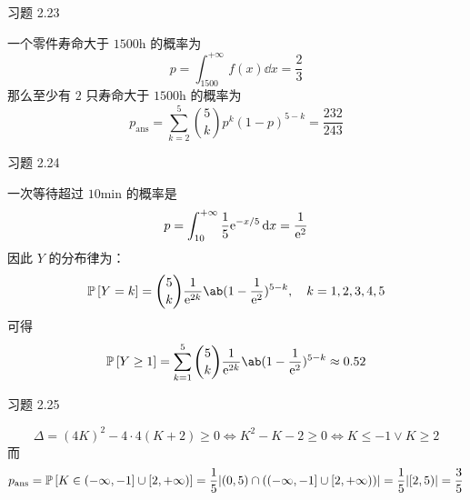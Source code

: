\begin{problem}
\begin{enumerate}
\begin{figure}[H]
        \end{figure}
    \end{enumerate}
\end{problem}

\begin{problem}
    习题 2.23
    \begin{solution}
        一个零件寿命大于 $1500 \mathrm{h}$ 的概率为
        $$
        p = \int_{1500}^{+ \infty} f(x) \dd{x} = \frac{2}{3}
        $$
        那么至少有 $2$ 只寿命大于 $1500 \mathrm{h}$ 的概率为
        $$
        p_{\text{ans}} = \sum_{k = 2}^{5} \binom{5}{k} p^{k} (1 - p)^{5 - k} = \frac{232}{243}
        $$
    \end{solution}
\end{problem}

\begin{problem}
    习题 2.24
    \begin{solution}
        一次等待超过 $10 \mathrm{min}$ 的概率是
        $$
        p = \int_{10}^{+ \infty} \frac{1}{5} \mathrm{e}^{-x / 5} \dd{x} = \frac{1}{\mathrm{e}^2}
        $$
        因此 $Y$ 的分布律为：
        $$
        \prob{Y = k} = \binom{5}{k} \frac{1}{\E^{2k}} \ab(1 - \frac{1}{\E^2})^{5 - k}, \quad k = 1, 2, 3, 4, 5
        $$
        可得
        $$
        \prob{Y \ge 1} = \sum_{k = 1}^{5} \binom{5}{k} \frac{1}{\E^{2k}} \ab(1 - \frac{1}{\E^2})^{5 - k} \approx 0.52
        $$
    \end{solution}
\end{problem}

\begin{problem}
    习题 2.25
    \begin{solution}
        $$
        \Delta = (4K)^2 - 4 \cdot 4 (K + 2) \ge 0 \iff K^2 - K - 2 \ge 0 \iff K \le -1 \lor K \ge 2
        $$
        而
        $$
        p_{\text{ans}} = \operatorname{\mathbb{P}}\left[K \in (-\infty, -1] \cup [2, +\infty)\right] = \frac{1}{5} \abs{(0, 5) \cap ((- \infty, -1] \cup [2, + \infty))} = \frac{1}{5} \abs{[2, 5)} = \frac{3}{5}
        $$
    \end{solution}
\end{problem}

